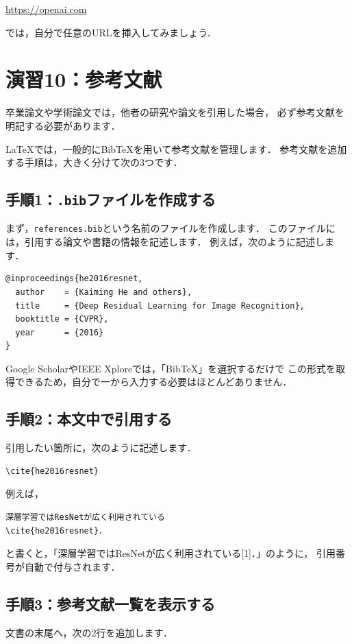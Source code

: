 \documentclass[a4paper,twocolumn]{jsarticle}
\begin{document}
\url{https://openai.com}

では，自分で任意のURLを挿入してみましょう．


\section*{演習10：参考文献}
卒業論文や学術論文では，他者の研究や論文を引用した場合，
必ず参考文献を明記する必要があります．

LaTeXでは，一般的にBibTeXを用いて参考文献を管理します．
参考文献を追加する手順は，大きく分けて次の3つです．

\subsection*{手順1：\texttt{.bib}ファイルを作成する}
まず，\texttt{references.bib}という名前のファイルを作成します．
このファイルには，引用する論文や書籍の情報を記述します．
例えば，次のように記述します．

\begin{lstlisting}[language={}]
@inproceedings{he2016resnet,
  author    = {Kaiming He and others},
  title     = {Deep Residual Learning for Image Recognition},
  booktitle = {CVPR},
  year      = {2016}
}
\end{lstlisting}

Google ScholarやIEEE Xploreでは，「BibTeX」を選択するだけで
この形式を取得できるため，自分で一から入力する必要はほとんどありません．

\subsection*{手順2：本文中で引用する}
引用したい箇所に，次のように記述します．

\begin{verbatim}
\cite{he2016resnet}
\end{verbatim}

例えば，

\begin{verbatim}
深層学習ではResNetが広く利用されている
\cite{he2016resnet}．
\end{verbatim}

と書くと，「深層学習ではResNetが広く利用されている[1]．」のように，
引用番号が自動で付与されます．

\subsection*{手順3：参考文献一覧を表示する}
文書の末尾へ，次の2行を追加します．
\end{document}
